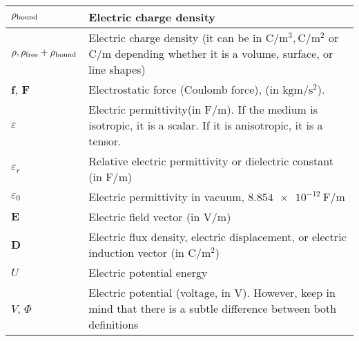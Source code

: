 \documentclass{article}
\begin{document}
\begin{xltabular}{\textwidth}{XX}
	\(\rho_{\textnormal{bound}}\)                                & Electric charge density                                                                                                                                                                  \\ \hline
	\(\rho, \rho_{\textnormal{free}}+\rho_{\textnormal{bound}}\) & Electric charge density (it can be in \(\si{\coulomb\per\meter^3}, \si{\coulomb\per\meter^2}\) or \(\si{\coulomb\per\meter}\) depending whether it is a volume, surface, or line shapes) \\ \hline
	\(\mathbf{f}\)\cite{ramoFieldsWavesCommunication1994}, \(\mathbf{F}\)\cite{wiki:coulomb-law}                                               & Electrostatic force (Coulomb force), (in \(\si{\kilo\gram\meter\per\second\squared}\)).                   \\ \hline
	\(\varepsilon\)                                              & Electric permittivity(in \(\si{\farad\per\meter}\)). If the medium is isotropic, it is a scalar. If it is anisotropic, it is a tensor. \cite{ramoFieldsWavesCommunication1994}           \\ \hline
	\(\varepsilon_r\)                                            & Relative electric permittivity or dielectric constant (in \(\si{\farad\per\meter}\)) \cite{ramoFieldsWavesCommunication1994}                                                             \\ \hline
	\(\varepsilon_0\)                                            & Electric permittivity in vacuum, \(\SI{8.854e-12}{\farad\per\meter}\) \cite{ramoFieldsWavesCommunication1994}                                                                            \\ \hline
	\(\mathbf{E}\)                                               & Electric field vector (in \(\si{\volt\per\meter}\))                                                                                                                                      \\ \hline
	\(\mathbf{D}\)                                               & Electric flux density, electric displacement, or electric induction vector (in \(\si{\coulomb\per\meter\squared}\))                                                                      \\ \hline
    \(U\) & Electric potential energy \\ \hline
    \(V\)\cite{wiki:electric-potential}, \(\Phi\)\cite{ramoFieldsWavesCommunication1994} & Electric potential (voltage, in \(\si{\volt}\)). However, keep in mind that there is a subtle difference between both definitions \cite{wiki:electric-potential-vs-voltage}  \\ \hline

\end{xltabular}
\end{document}
